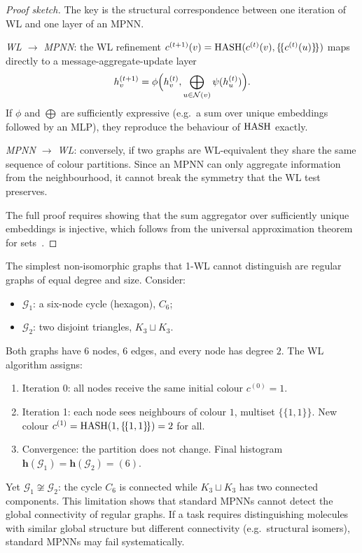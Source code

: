 \begin{proof}[Proof sketch]
The key is the structural correspondence between one iteration of WL and one
layer of an MPNN.

\emph{WL $\to$ MPNN}: the WL refinement
$c^{(t+1)}(v) = \operatorname{HASH}(c^{(t)}(v), \{\!\{c^{(t)}(u)\}\!\})$ maps directly to a
message-aggregate-update layer
\[
  h_v^{(t+1)} = \phi\Bigl(h_v^{(t)},
      \bigoplus_{u \in \mathcal{N}(v)} \psi(h_u^{(t)})\Bigr).
\]
If $\phi$ and $\bigoplus$ are sufficiently expressive (e.g.\ a sum over unique
embeddings followed by an MLP), they reproduce the behaviour of $\operatorname{HASH}$ exactly.

\emph{MPNN $\to$ WL}: conversely, if two graphs are WL-equivalent they share the
same sequence of colour partitions. Since an MPNN can only aggregate information
from the neighbourhood, it cannot break the symmetry that the WL test preserves.

The full proof requires showing that the sum aggregator over sufficiently unique
embeddings is injective, which follows from the universal approximation theorem
for sets~\citep{zaheer2017deepsets}. \qedhere
\end{proof}

\begin{example}
\label{ex:priors:wl-indistinguishable}
The simplest non-isomorphic graphs that 1-WL cannot distinguish are regular
graphs of equal degree and size. Consider:
\begin{itemize}
\item $\mathcal{G}_1$: a six-node cycle (hexagon), $C_6$;
\item $\mathcal{G}_2$: two disjoint triangles, $K_3 \sqcup K_3$.
\end{itemize}
Both graphs have $6$ nodes, $6$ edges, and every node has degree $2$. The WL
algorithm assigns:
\begin{enumerate}
\item Iteration 0: all nodes receive the same initial colour $c^{(0)} = 1$.
\item Iteration 1: each node sees neighbours of colour $1$, multiset
$\{\!\{1, 1\}\!\}$. New colour $c^{(1)} = \operatorname{HASH}(1, \{\!\{1, 1\}\!\}) = 2$ for all.
\item Convergence: the partition does not change. Final histogram
$\mathbf{h}(\mathcal{G}_1) = \mathbf{h}(\mathcal{G}_2) = (6)$.
\end{enumerate}
Yet $\mathcal{G}_1 \not\cong \mathcal{G}_2$: the cycle $C_6$ is connected while
$K_3 \sqcup K_3$ has two connected components. This limitation shows that
standard MPNNs cannot detect the global connectivity of regular graphs. If a task
requires distinguishing molecules with similar global structure but different
connectivity (e.g.\ structural isomers), standard MPNNs may fail
systematically.
\end{example}

